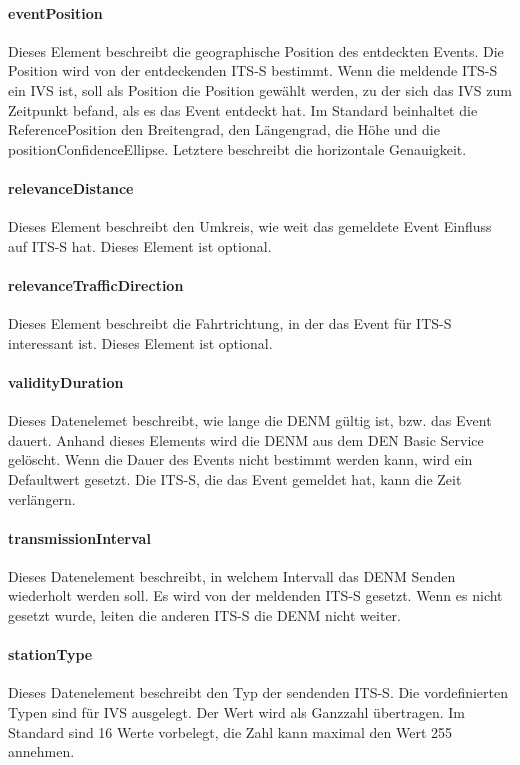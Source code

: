 \paragraph{eventPosition}
Dieses Element beschreibt die geographische Position des entdeckten Events. Die Position wird von der entdeckenden \ac{ITS-S} bestimmt. Wenn die meldende \ac{ITS-S} ein \ac{IVS} ist, soll als Position die Position gewählt werden, zu der sich das \ac{IVS} zum Zeitpunkt befand, als es das Event entdeckt hat. Im Standard \cite{ts102894-2} beinhaltet die ReferencePosition den Breitengrad, den Längengrad, die Höhe und die positionConfidenceEllipse. Letztere beschreibt die horizontale Genauigkeit.


\paragraph{relevanceDistance}
Dieses Element beschreibt den Umkreis, wie weit das gemeldete Event Einfluss auf \ac{ITS-S} hat. Dieses Element ist optional. 

\paragraph{relevanceTrafficDirection}
Dieses Element beschreibt die Fahrtrichtung, in der das Event für \ac{ITS-S} interessant ist. Dieses Element ist optional. 

\paragraph{validityDuration}
Dieses Datenelemet   beschreibt, wie lange die \ac{DENM} gültig ist, bzw. das Event dauert. Anhand dieses Elements wird die \ac{DENM} aus dem \ac{DEN} Basic Service gelöscht. Wenn die Dauer des Events nicht bestimmt werden kann, wird ein Defaultwert gesetzt. Die \ac{ITS-S}, die das Event gemeldet hat, kann die Zeit verlängern.  

\paragraph{transmissionInterval}
Dieses Datenelement beschreibt, in welchem Intervall das \ac{DENM} Senden wiederholt werden soll. Es wird von der meldenden \ac{ITS-S} gesetzt. Wenn es nicht gesetzt wurde, leiten die anderen \ac{ITS-S} die \ac{DENM} nicht weiter. 

\paragraph{stationType}
Dieses Datenelement beschreibt den Typ der sendenden \ac{ITS-S}. Die vordefinierten Typen sind für \ac{IVS} ausgelegt. Der Wert wird als Ganzzahl übertragen. Im Standard \cite{ts102894-2} sind  16 Werte vorbelegt, die Zahl kann maximal den Wert 255 annehmen.


